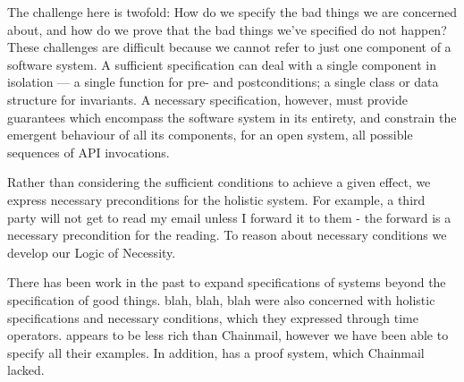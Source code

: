 The challenge here is twofold: How do we specify the bad things we are
concerned about, and how do we prove that the bad things we've
specified do not happen?  These challenges are difficult because we
cannot refer to just one component of a software system.  A sufficient
specification can deal with a single component in isolation --- a
single function for pre- and postconditions; a single class or data
structure for invariants. A necessary specification, however, must
provide guarantees which encompass the software system in its
entirety, and constrain the emergent behaviour of all its components,
for an open system, all possible sequences of API invocations.


Rather than considering the sufficient conditions to
achieve a given effect, we express necessary preconditions for the
holistic system. For example, a third party will not get to read my
email unless I forward it to them - the forward is a necessary
precondition for the reading. To reason about necessary conditions we
develop our Logic of Necessity. 

There has been work in the past to expand specifications of systems beyond the specification of good things.  blah, blah, blah  \citeauthor{FASE} were also concerned with 
 holistic specifications and necessary conditions, which they expressed through time operators.
 \Chainmail appears to be less rich than Chainmail, however we have been able to specify all their examples. In addition, \Chainmail has a proof system, which Chainmail lacked.
 




